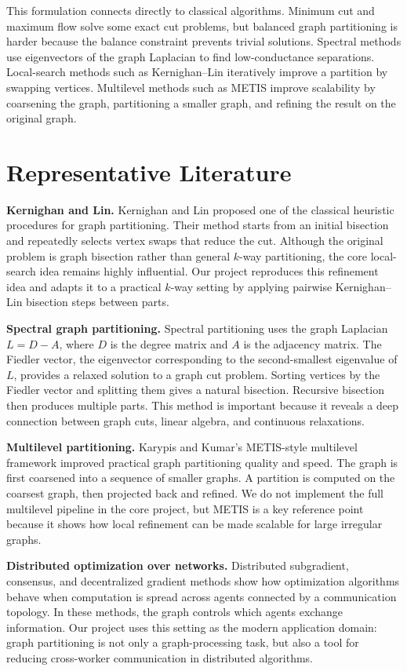 \documentclass[11pt]{article}
\begin{document}
This formulation connects directly to classical algorithms. Minimum cut and
maximum flow solve some exact cut problems, but balanced graph partitioning is
harder because the balance constraint prevents trivial solutions. Spectral
methods use eigenvectors of the graph Laplacian to find low-conductance
separations. Local-search methods such as Kernighan--Lin iteratively improve a
partition by swapping vertices. Multilevel methods such as METIS improve
scalability by coarsening the graph, partitioning a smaller graph, and refining
the result on the original graph.

\section{Representative Literature}

\textbf{Kernighan and Lin.}
Kernighan and Lin proposed one of the classical heuristic procedures for graph
partitioning. Their method starts from an initial bisection and repeatedly
selects vertex swaps that reduce the cut. Although the original problem is
graph bisection rather than general $k$-way partitioning, the core local-search
idea remains highly influential. Our project reproduces this refinement idea
and adapts it to a practical $k$-way setting by applying pairwise
Kernighan--Lin bisection steps between parts.

\textbf{Spectral graph partitioning.}
Spectral partitioning uses the graph Laplacian $L=D-A$, where $D$ is the degree
matrix and $A$ is the adjacency matrix. The Fiedler vector, the eigenvector
corresponding to the second-smallest eigenvalue of $L$, provides a relaxed
solution to a graph cut problem. Sorting vertices by the Fiedler vector and
splitting them gives a natural bisection. Recursive bisection then produces
multiple parts. This method is important because it reveals a deep connection
between graph cuts, linear algebra, and continuous relaxations.

\textbf{Multilevel partitioning.}
Karypis and Kumar's METIS-style multilevel framework improved practical graph
partitioning quality and speed. The graph is first coarsened into a sequence of
smaller graphs. A partition is computed on the coarsest graph, then projected
back and refined. We do not implement the full multilevel pipeline in the core
project, but METIS is a key reference point because it shows how local
refinement can be made scalable for large irregular graphs.

\textbf{Distributed optimization over networks.}
Distributed subgradient, consensus, and decentralized gradient methods show
how optimization algorithms behave when computation is spread across agents
connected by a communication topology. In these methods, the graph controls
which agents exchange information. Our project uses this setting as the modern
application domain: graph partitioning is not only a graph-processing task, but
also a tool for reducing cross-worker communication in distributed algorithms.
\end{document}
